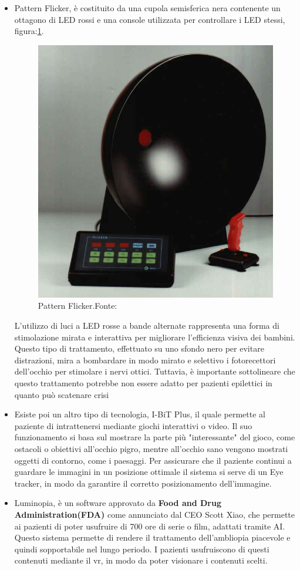 \documentclass[
a4paper,
cleardoublepage=empty,
headings=twolinechapter,
numbers=autoenddot,
]{scrbook}
\begin{document}
\begin{itemize}
		
		
		\item Pattern Flicker\cite{Pattern-Flicker}, è costituito da una cupola semisferica nera contenente un ottagono di LED rossi e una console utilizzata per controllare i LED stessi, figura:\ref{fig:Pattern-Flicker}.
		\begin{figure}[H]
			\centering
			\includegraphics[width=0.4\linewidth]{image/Pattern_Flicker}
			\caption{Pattern Flicker.Fonte:\cite{Pattern-Flicker}}
			\label{fig:Pattern-Flicker}
		\end{figure}
		L'utilizzo di luci a LED rosse a bande alternate rappresenta una forma di stimolazione mirata e interattiva per migliorare l'efficienza visiva dei bambini. Questo tipo di trattamento, effettuato su uno sfondo nero per evitare distrazioni, mira a bombardare in modo mirato e selettivo i fotorecettori dell'occhio per stimolare i nervi ottici. Tuttavia, è importante sottolineare che questo trattamento potrebbe non essere adatto per pazienti epilettici in quanto può scatenare crisi
		\item Esiste poi un altro tipo di tecnologia, I-BiT Plus\cite{I-Bit}, il quale permette al paziente di intrattenersi mediante giochi interattivi o video.
		Il suo funzionamento si basa sul mostrare la parte più "interessante" del gioco, come ostacoli o obiettivi all'occhio pigro, mentre all'occhio sano vengono mostrati oggetti di contorno, come i paesaggi.
		Per assicurare che il paziente continui a guardare le immagini in un posizione ottimale il sistema si serve di un Eye tracker, in modo da garantire il corretto posizionamento dell'immagine.
		\item Luminopia, è un software approvato da \textbf{Food and Drug Administration(FDA)}\cite{Approvazione_luminopia} come annunciato dal CEO Scott Xiao, che permette ai pazienti di poter usufruire di 700 ore di serie o film, adattati tramite AI. Questo sistema permette di rendere il trattamento dell'ambliopia piacevole e quindi sopportabile nel lungo periodo.
		I pazienti usufruiscono di questi contenuti mediante il vr, in modo da poter visionare i contenuti scelti.
	

\end{itemize}
\end{document}
